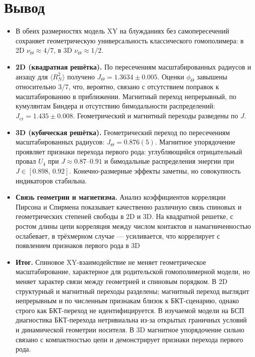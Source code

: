  
 
 
 \section{Вывод}
 
 
 \begin{itemize}
 	\item В обеих размерностях модель XY на блужданиях без самопересечений сохраняет геометрическую универсальность классического гомополимера: в 2D $\nu_{\Theta}\approx 4/7$, в 3D $\nu_{\Theta}\approx 1/2$.
 	
 	\item \textbf{2D (квадратная решётка).} По пересечениям масштабированных радиусов и анзацу для $\langle R_N^2\rangle$ получено
 	$J_{\Theta}=1.3634\pm0.005$. Оценки $\phi_{\Theta}$ завышены относительно $3/7$, что, вероятно, связано с отсутствием поправок к масштабированию в приближении. Магнитный переход непрерывный, по кумулянтам Биндера и отсутствию бимодальности распределений: $J_{\mathrm{cr}}=1.435\pm0.008$. Геометрический и магнитный переходы разведены по $J$.
 	
 	\item \textbf{3D (кубическая решётка).} Геометрический переход по пересечениям масштабированных радиусов: $J_{\Theta}=0.876(5)$. Магнитное упорядочение проявляет признаки перехода первого рода: углубляющийся отрицательный провал $U_4$ при $J\approx0.87\text{–}0.91$ и бимодальные распределения энергии при $J\in[0.898,\,0.92]$. Конечно-размерные эффекты заметны, но совокупность индикаторов стабильна.
 	
 	\item  \textbf{Связь геометрии и магнетизма.}  Анализ коэффициентов корреляции Пирсона и Спирмена показывает качественно различную связь спиновых и геометрических степеней свободы в 2D и 3D. На квадратной решетке, с ростом длины цепи корреляция между числом контактов и намагниченностью ослабевает, в трёхмерном случае --- усиливается, что коррелирует с появлением признаков первого рода в 3D 
 	
\item \textbf{Итог.} 
Спиновое XY-взаимодействие не меняет геометрическое масштабирование, характерное для родительской гомополимерной модели, но меняет характер связи между геометрией и спиновым порядком. 
В 2D структурный и магнитный переходы разделены; магнитный переход выглядит непрерывным и по численным признакам близок к БКТ-сценарию, однако строго как БКТ-переход не идентифицируется. В изучаемой модели  на БСП  диагностика БКТ-перехода нетривиальна из-за открытых граничных условий и динамической геометрии носителя. 
В 3D магнитное упорядочение сильно связано с компактностью цепи и демонстрирует признаки перехода первого рода.
 	
 
 \end{itemize}
 
 
 
